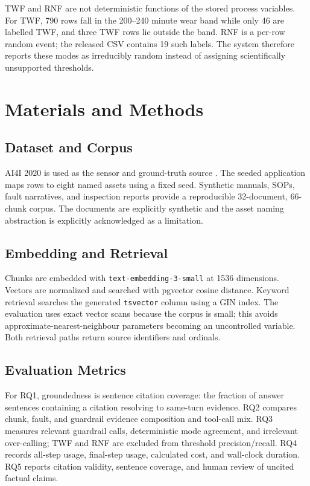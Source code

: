 \documentclass[conference]{IEEEtran}
\begin{document}
TWF and RNF are not deterministic functions of the stored process variables.
For TWF, 790 rows fall in the 200--240 minute wear band while only 46 are
labelled TWF, and three TWF rows lie outside the band. RNF is a per-row random
event; the released CSV contains 19 such labels. The system therefore reports
these modes as irreducibly random instead of assigning scientifically
unsupported thresholds.

\section{Materials and Methods}
\subsection{Dataset and Corpus}
AI4I 2020 is used as the sensor and ground-truth source
\cite{matzka2020ai4i}. The seeded application maps rows to eight named assets
using a fixed seed. Synthetic manuals, SOPs, fault narratives, and
inspection reports provide a reproducible 32-document, 66-chunk corpus.
The documents are explicitly synthetic and the asset naming abstraction is
explicitly acknowledged as a limitation.

\subsection{Embedding and Retrieval}
Chunks are embedded with \texttt{text-embedding-3-small} at 1536 dimensions.
Vectors are normalized and searched with pgvector cosine distance. Keyword
retrieval searches the generated \texttt{tsvector} column using a GIN index.
The evaluation uses exact vector scans because the corpus is small; this
avoids approximate-nearest-neighbour parameters becoming an uncontrolled
variable. Both retrieval paths return source identifiers and ordinals.

\subsection{Evaluation Metrics}
For RQ1, groundedness is sentence citation coverage: the fraction of answer
sentences containing a citation resolving to same-turn evidence. RQ2
compares chunk, fault, and guardrail evidence composition and tool-call mix.
RQ3 measures relevant guardrail calls, deterministic mode agreement, and
irrelevant over-calling; TWF and RNF are excluded from threshold
precision/recall. RQ4 records all-step usage, final-step usage, calculated
cost, and wall-clock duration. RQ5 reports citation validity, sentence
coverage, and human review of uncited factual claims.
\end{document}

